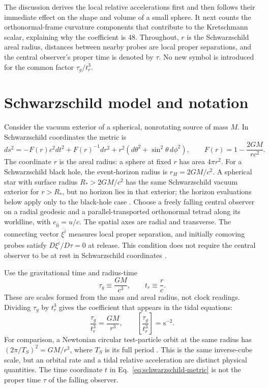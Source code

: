 \documentclass[12pt]{article}
\begin{document}
The discussion derives the local relative accelerations first and then follows their immediate effect on the shape and volume of a small sphere. It next counts the orthonormal-frame curvature components that contribute to the Kretschmann scalar, explaining why the coefficient is $48$. Throughout, $r$ is the Schwarzschild areal radius, distances between nearby probes are local proper separations, and the central observer's proper time is denoted by $\tau$. No new symbol is introduced for the common factor $\tau_g/t_r^3$.

\section{Schwarzschild model and notation}
\label{sec:model}

Consider the vacuum exterior of a spherical, nonrotating source of mass $M$. In Schwarzschild coordinates the metric is
\begin{equation}
  ds^2=-F(r)c^2dt^2+F(r)^{-1}dr^2
      +r^2\left(d\theta^2+\sin^2\theta\,d\phi^2\right),
  \qquad
  F(r)=1-\frac{2GM}{rc^2}.
  \label{eq:schwarzschild-metric}
\end{equation}
The coordinate $r$ is the areal radius: a sphere at fixed $r$ has area $4\pi r^2$. For a Schwarzschild black hole, the event-horizon radius is $r_H=2GM/c^2$. A spherical star with surface radius $R_*>2GM/c^2$ has the same Schwarzschild vacuum exterior for $r>R_*$, but no horizon lies in that exterior; the horizon evaluations below apply only to the black-hole case \cite{TongGR}. Choose a freely falling central observer on a radial geodesic and a parallel-transported orthonormal tetrad along its worldline, with $e_{\hat 0}=u/c$. The spatial axes are radial and transverse. The connecting vector $\xi^{\hat i}$ measures local proper separation, and initially comoving probes satisfy $D\xi^{\hat i}/D\tau=0$ at release. This condition does not require the central observer to be at rest in Schwarzschild coordinates \cite{HamiltonGR}.

Use the gravitational time and radius-time
\begin{equation}
  \tau_g\equiv\frac{GM}{c^3},
  \qquad
  t_r\equiv\frac{r}{c}.
  \label{eq:time-definitions}
\end{equation}
These are scales formed from the mass and areal radius, not clock readings. Dividing $\tau_g$ by $t_r^3$ gives the coefficient that appears in the tidal equations:
\begin{equation}
  \frac{\tau_g}{t_r^3}=\frac{GM}{r^3},
  \qquad
  \left[\frac{\tau_g}{t_r^3}\right]=\mathrm{s^{-2}}.
  \label{eq:shared-scale}
\end{equation}
For comparison, a Newtonian circular test-particle orbit at the same radius has $(2\pi/T_S)^2=GM/r^3$, where $T_S$ is its full period \cite{NASAFlight}. This is the same inverse-cube scale, but an orbital rate and a tidal relative acceleration are distinct physical quantities. The time coordinate $t$ in Eq.~\eqref{eq:schwarzschild-metric} is not the proper time $\tau$ of the falling observer.
\end{document}

